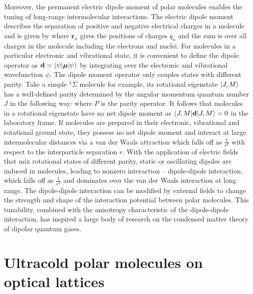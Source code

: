 Moreover, the permanent electric dipole moment of polar molecules enables the tuning of long-range intermolecular 
interactions. The electric dipole moment describes the separation of positive and negative electrical charges
in a molecule and is given by
where $\mathbf{r}_{n}$ gives the positions of charges $q_n$ and the sum is over all charges in the molecule including 
the electrons and nuclei. For molecules in a particular electronic and vibrational state, it is convenient to define the
dipole operator as $\mathbf{d} = \langle \psi | \boldsymbol{\mu} | \psi \rangle$ by integrating over the electronic and
vibrational wavefunction $\psi$. The dipole moment operator only couples states with different
parity. Take a simple $^{1}\Sigma$ molecule for example,  its rotational eigenstate $| J, M \rangle$  has a well-defined parity 
determined by the angular momentum quantum number $J$ in the following way:
where $P$ is the parity operator. It follows that molecules in a rotational eigenstate have no net dipole moment as $\langle J, M | \mathbf{d} | J, M \rangle = 0$ in the laboratory frame. 
If molecules are prepared in their electronic, vibrational and rotational ground state, they possess no net
dipole moment and interact at large intermolecular distances via a van der Waals attraction which falls off as $\frac{1 }{r^6}$ with respect to the
interparticle separation $r$. With the application of electric fields that mix rotational states of different parity, static or 
oscillating dipoles are induced in molecules, leading to nonzero interaction -- dipole-dipole interaction, which falls off
as $\frac{1}{r^3}$ and dominates over the van der Waals interaction at long range. The dipole-dipole interaction can be
modified by external fields to change the strength and shape of the interaction potential between 
polar molecules\cite{micheli2007, buchler2007a}. This tunability, combined with the anisotropy characteristic of the
dipole-dipole interaction, has inspired a large body of research on the condensed matter theory of dipolar quantum 
gases\cite{baranov2008, lahaye2009, trefzger2011, Baranov2012}. 




\section{Ultracold polar molecules on optical lattices}
\label{sec:opticalLattice}

